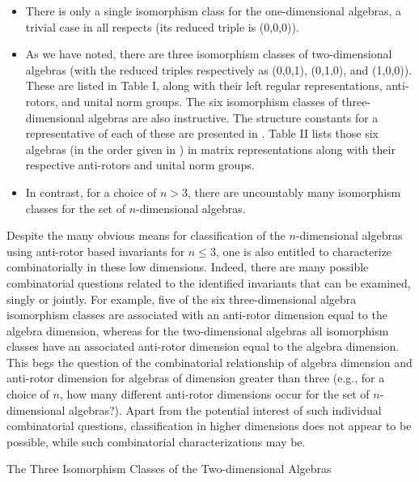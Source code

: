 \documentclass{amsart}
\numberwithin{equation}{section}
\theoremstyle{definition}
\numberwithin{theorem}{section}
\begin{document}
 \medskip
 
 \begin{itemize}
\item There is only a single isomorphism class for the one-dimensional algebras, a trivial case in all respects (its reduced triple is (0,0,0)).
\item
As we have noted, there are three isomorphism classes of two-dimensional algebras (with the reduced triples respectively as (0,0,1), (0,1,0), and (1,0,0)). These are listed in Table I, along with their left regular representations, anti-rotors, and unital norm groups. 
The six isomorphism classes of three-dimensional algebras are also instructive.  The structure constants for a representative of each of these are presented in \cite{kobayashi:2021}.  Table II lists those six algebras (in the order given in \cite{kobayashi:2021}) in matrix representations along with their respective anti-rotors and unital norm groups. 
\item 
In contrast, for a choice of $n>3$, there are uncountably many isomorphism classes for the set of $n$-dimensional algebras.
\end{itemize}

\bigskip

Despite the many obvious means for classification of the $n$-dimensional algebras using anti-rotor based invariants for $n\le 3$, one is also entitled to characterize combinatorially in these low dimensions.  Indeed, there are many possible combinatorial questions related to the identified invariants that can be examined, singly or jointly.  For example, five of the six three-dimensional algebra isomorphism classes are associated with an anti-rotor dimension equal to the algebra dimension, whereas for the two-dimensional algebras all isomorphism classes have an associated anti-rotor dimension equal to the algebra dimension.  This begs the question of the combinatorial relationship of algebra dimension and anti-rotor dimension for algebras of dimension greater than three (e.g., for a choice of $n$, how many different anti-rotor dimensions occur for the set of $n$-dimensional algebras?).   Apart from the potential interest of such individual combinatorial questions, classification in higher dimensions does not appear to be possible, while such combinatorial characterizations may be.
 
\pagebreak
\hspace{0pt}
\vfill


  \centerline{\Large The Three Isomorphism Classes of the Two-dimensional Algebras } 
\end{document}

